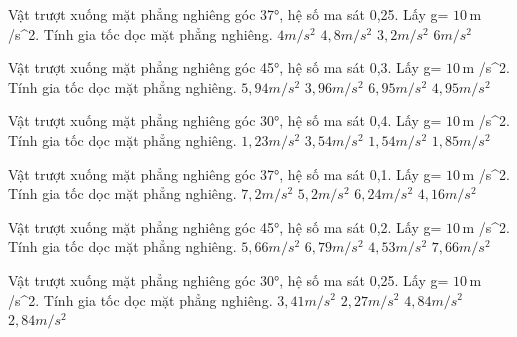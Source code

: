 \begin{ex}
Vật trượt xuống mặt phẳng nghiêng góc 37°, hệ số ma sát 0,25. Lấy g= $10\,\text{m}$ /s^2. Tính gia tốc dọc mặt phẳng nghiêng.
\choice
{\True $4 m/s^2$}
{$4,8 m/s^2$}
{$3,2 m/s^2$}
{$6 m/s^2$}
\end{ex}

\begin{ex}
Vật trượt xuống mặt phẳng nghiêng góc 45°, hệ số ma sát 0,3. Lấy g= $10\,\text{m}$ /s^2. Tính gia tốc dọc mặt phẳng nghiêng.
\choice
{$5,94 m/s^2$}
{$3,96 m/s^2$}
{$6,95 m/s^2$}
{\True $4,95 m/s^2$}
\end{ex}

\begin{ex}
Vật trượt xuống mặt phẳng nghiêng góc 30°, hệ số ma sát 0,4. Lấy g= $10\,\text{m}$ /s^2. Tính gia tốc dọc mặt phẳng nghiêng.
\choice
{$1,23 m/s^2$}
{$3,54 m/s^2$}
{\True $1,54 m/s^2$}
{$1,85 m/s^2$}
\end{ex}

\begin{ex}
Vật trượt xuống mặt phẳng nghiêng góc 37°, hệ số ma sát 0,1. Lấy g= $10\,\text{m}$ /s^2. Tính gia tốc dọc mặt phẳng nghiêng.
\choice
{$7,2 m/s^2$}
{\True $5,2 m/s^2$}
{$6,24 m/s^2$}
{$4,16 m/s^2$}
\end{ex}

\begin{ex}
Vật trượt xuống mặt phẳng nghiêng góc 45°, hệ số ma sát 0,2. Lấy g= $10\,\text{m}$ /s^2. Tính gia tốc dọc mặt phẳng nghiêng.
\choice
{\True $5,66 m/s^2$}
{$6,79 m/s^2$}
{$4,53 m/s^2$}
{$7,66 m/s^2$}
\end{ex}

\begin{ex}
Vật trượt xuống mặt phẳng nghiêng góc 30°, hệ số ma sát 0,25. Lấy g= $10\,\text{m}$ /s^2. Tính gia tốc dọc mặt phẳng nghiêng.
\choice
{$3,41 m/s^2$}
{$2,27 m/s^2$}
{$4,84 m/s^2$}
{\True $2,84 m/s^2$}
\end{ex}

